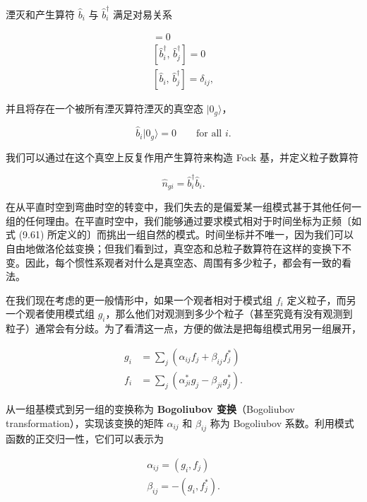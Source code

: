 湮灭和产生算符 $\hat{b}_i$ 与 $\hat{b}^{\dagger}_i$ 满足对易关系

\begin{gather*}
[\hat{b}_i,\, \hat{b}_j] = 0 \\
[\hat{b}^{\dagger}_i,\, \hat{b}^{\dagger}_j] = 0 \\
[\hat{b}_i,\, \hat{b}^{\dagger}_j] = \delta_{ij},
\tag{9.103}
\end{gather*}

并且将存在一个被所有湮灭算符湮灭的真空态 $|0_g\rangle$，

\begin{equation*}
\hat{b}_i|0_g\rangle = 0 \qquad \text{for all } i.
\tag{9.104}
\end{equation*}

我们可以通过在这个真空上反复作用产生算符来构造 Fock 基，并定义粒子数算符

\begin{equation*}
\hat{n}_{gi} = \hat{b}^{\dagger}_i\hat{b}_i.
\tag{9.105}
\end{equation*}

在从平直时空到弯曲时空的转变中，我们失去的是偏爱某一组模式甚于其他任何一组的任何理由。在平直时空中，我们能够通过要求模式相对于时间坐标为正频〔如式 (9.61) 所定义的〕而挑出一组自然的模式。时间坐标并不唯一，因为我们可以自由地做洛伦兹变换；但我们看到过，真空态和总粒子数算符在这样的变换下不变。因此，每个惯性系观者对什么是真空态、周围有多少粒子，都会有一致的看法。

在我们现在考虑的更一般情形中，如果一个观者相对于模式组 $f_i$ 定义粒子，而另一个观者使用模式组 $g_i$，那么他们对观测到多少个粒子（甚至究竟有没有观测到粒子）通常会有分歧。为了看清这一点，方便的做法是把每组模式用另一组展开，

\begin{align*}
g_i &= \sum_j\left(\alpha_{ij}f_j + \beta_{ij}f^{*}_j\right) \\
f_i &= \sum_j\left(\alpha^{*}_{ji}g_j - \beta_{ji}g^{*}_j\right).
\tag{9.106}
\end{align*}

从一组基模式到另一组的变换称为 \textbf{Bogoliubov 变换}（Bogoliubov transformation），实现该变换的矩阵 $\alpha_{ij}$ 和 $\beta_{ij}$ 称为 Bogoliubov 系数。利用模式函数的正交归一性，它们可以表示为

\begin{gather*}
\alpha_{ij} = (g_i, f_j) \\
\beta_{ij} = -(g_i, f^{*}_j).
\tag{9.107}
\end{gather*}

